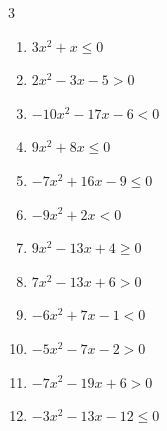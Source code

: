 \begin{multicols}{3}
\begin{enumerate}
  \item $3x^{2}+x\leq 0$


\columnbreak %

  \item $2x^{2}-3x-5>0$


  \item $-10x^{2}-17x-6<0$


  \item $9x^{2}+8x\leq 0$


  \item $-7x^{2}+16x-9\leq 0$


  \item $-9x^{2}+2x<0$


  \item $9x^{2}-13x+4\geq 0$


  \item $7x^{2}-13x+6>0$


  \item $-6x^{2}+7x-1<0$


  \item $-5x^{2}-7x-2>0$


  \item $-7x^{2}-19x+6>0$


\columnbreak %

\resetques

  \item $-3x^{2}-13x-12\leq 0$


\end{enumerate}
\end{multicols}
